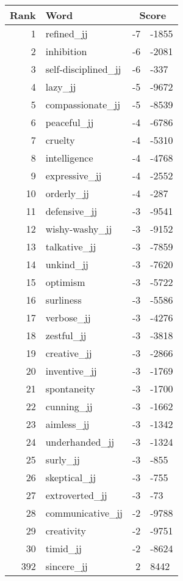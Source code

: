 \begin{longtable}[!htbp]{| rlr@{.}l |}
    \hline
    \textbf{Rank} & \textbf{Word} & \multicolumn{2}{c|}{\textbf{Score}} \\
    \hline
    \endhead
    1 & refined\_jj & -7 & -1855 \\
    2 & inhibition & -6 & -2081 \\
    3 & self-disciplined\_jj & -6 & -337 \\
    4 & lazy\_jj & -5 & -9672 \\
    5 & compassionate\_jj & -5 & -8539 \\
    6 & peaceful\_jj & -4 & -6786 \\
    7 & cruelty & -4 & -5310 \\
    8 & intelligence & -4 & -4768 \\
    9 & expressive\_jj & -4 & -2552 \\
    10 & orderly\_jj & -4 & -287 \\
    11 & defensive\_jj & -3 & -9541 \\
    12 & wishy-washy\_jj & -3 & -9152 \\
    13 & talkative\_jj & -3 & -7859 \\
    14 & unkind\_jj & -3 & -7620 \\
    15 & optimism & -3 & -5722 \\
    16 & surliness & -3 & -5586 \\
    17 & verbose\_jj & -3 & -4276 \\
    18 & zestful\_jj & -3 & -3818 \\
    19 & creative\_jj & -3 & -2866 \\
    20 & inventive\_jj & -3 & -1769 \\
    21 & spontaneity & -3 & -1700 \\
    22 & cunning\_jj & -3 & -1662 \\
    23 & aimless\_jj & -3 & -1342 \\
    24 & underhanded\_jj & -3 & -1324 \\
    25 & surly\_jj & -3 & -855 \\
    26 & skeptical\_jj & -3 & -755 \\
    27 & extroverted\_jj & -3 & -73 \\
    28 & communicative\_jj & -2 & -9788 \\
    29 & creativity & -2 & -9751 \\
    30 & timid\_jj & -2 & -8624 \\
    392 & sincere\_jj & 2 & 8442 \\

\end{longtable}

